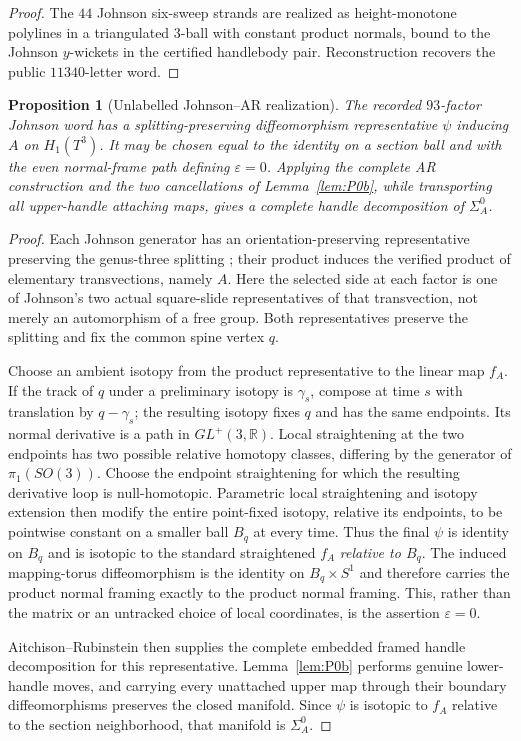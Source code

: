 \documentclass[11pt]{amsart}
\newtheorem{proposition}[theorem]{Proposition}
\theoremstyle{definition}
\theoremstyle{remark}
\begin{document}
\begin{proof}
The $44$ Johnson six-sweep strands are realized as height-monotone
polylines in a triangulated $3$-ball with constant product normals, bound to
the Johnson $y$-wickets in the certified handlebody pair.  Reconstruction
recovers the public $11340$-letter word.
\end{proof}

\begin{proposition}[Unlabelled Johnson--AR realization]
\label{prop:unlabelled-P0}
The recorded $93$-factor Johnson word has a splitting-preserving
diffeomorphism representative $\psi$ inducing $A$ on $H_1(T^3)$.  It may be
chosen equal to the identity on a section ball and with the even normal-frame
path defining $\varepsilon=0$.  Applying the complete AR construction and the
two cancellations of Lemma~\ref{lem:P0b}, while transporting all upper-handle
attaching maps, gives a complete handle decomposition of $\Sigma_A^0$.
\end{proposition}

\begin{proof}
Each Johnson generator has an orientation-preserving representative preserving
the genus-three splitting \cite{Johnson2011}; their product induces the
verified product of elementary transvections, namely $A$.  Here the selected
side at each factor is one of Johnson's two actual square-slide
representatives of that transvection, not merely an automorphism of a free
group.  Both representatives preserve the splitting and fix the common spine
vertex $q$.

Choose an ambient isotopy from the product representative to the linear map
$f_A$.  If the track of $q$ under a preliminary isotopy is $\gamma_s$, compose
at time $s$ with translation by $q-\gamma_s$; the resulting isotopy fixes
$q$ and has the same endpoints.  Its normal derivative is a path in
$GL^+(3,\mathbb R)$.  Local straightening at the two endpoints has two possible
relative homotopy classes, differing by the generator of $\pi_1(SO(3))$.
Choose the endpoint straightening for which the resulting derivative loop is
null-homotopic.  Parametric local straightening and isotopy extension then
modify the entire point-fixed isotopy, relative its endpoints, to be
pointwise constant on a smaller ball $B_q$ at every time.  Thus the final
$\psi$ is identity on $B_q$ and is isotopic to the standard straightened
$f_A$ \emph{relative to $B_q$}.  The induced mapping-torus diffeomorphism is
the identity on $B_q\times S^1$ and therefore carries the product normal
framing exactly to the product normal framing.  This, rather than the matrix
or an untracked choice of local coordinates, is the assertion
$\varepsilon=0$.

Aitchison--Rubinstein then supplies the complete embedded framed handle
decomposition for this representative.  Lemma~\ref{lem:P0b} performs genuine
lower-handle moves, and carrying every unattached upper map through their
boundary diffeomorphisms preserves the closed manifold.  Since $\psi$ is
isotopic to $f_A$ relative to the section neighborhood, that manifold is
$\Sigma_A^0$.
\end{proof}
\end{document}
